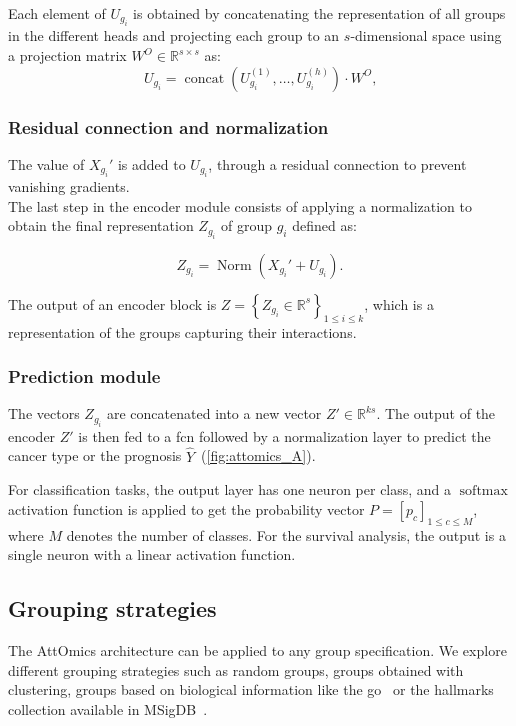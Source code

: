 \documentclass[../main.tex]{subfiles}
\begin{document}
		 Each element of $U_{g_i}$ is obtained by concatenating the representation of all groups in the different heads and projecting each group to an $s$-dimensional space using a projection matrix $W^O \in \mathbb{R}^{s\times s}$ as:
		 \[ U_{g_i} = \operatorname{concat}\left( U^{(1)}_{g_i}, \ldots, U^{(h)}_{g_i} \right) \cdot W^O \text{,}\]
	 \subsubsection{Residual connection and normalization}
		 The value of $X_{g_i}'$ is added to $U_{g_i}$, through a residual connection to prevent vanishing gradients.\\
		 The last step in the encoder module consists of applying a normalization to obtain the final representation $Z_{g_i}$ of group $g_i$ defined as:

		 \[Z_{g_i} = \operatorname{Norm}\left(X_{g_i}' + U_{g_i} \right) \text{.}\]

		 The output of an encoder block is $Z = \left\{ Z_{g_i} \in \mathbb{R}^{s}\right\}_{1 \leq i \leq k}$, which is a representation of the groups capturing their interactions.

	 \subsubsection{Prediction module}
		 The vectors $Z_{g_i}$ are concatenated into a new vector $Z' \in \mathbb{R}^{ks}$.
		 The output of the encoder $Z'$ is then fed to a \gls{fcn} followed by a normalization layer to predict the cancer type or the prognosis $\hat{Y}$~(\cref{fig:attomics_A}).

		 For classification tasks,  the output layer has one neuron per class, and a $\operatorname{softmax}$ activation function is applied to get the probability vector \(P = \left[p_c\right]_{1\leq c\leq M}\), where $M$ denotes the number of classes.
		 For the survival analysis, the output is a single neuron with a linear activation function.

 \subsection{Grouping strategies}\label{sec:grouping}

	 The AttOmics architecture can be applied to any group specification.
	 We explore different grouping strategies such as random groups, groups obtained with clustering, groups based on biological information like the \gls{go}~\cite{geneontologyconsortiumGeneOntologyResource2021} or the hallmarks collection available in MSigDB~\cite{Liberzon2015}.
\end{document}
